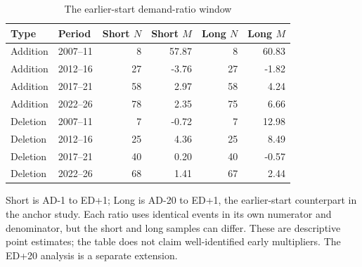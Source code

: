 \begin{table}[!htbp]
\centering
\caption{The earlier-start demand-ratio window}\label{tab:long_demand}
\small
\setlength{\tabcolsep}{5pt}
\begin{tabular}{llrrrr}
\toprule
Type & Period & Short $N$ & Short $M$ & Long $N$ & Long $M$ \\
\midrule
Addition & 2007--11 & 8 & 57.87 & 8 & 60.83 \\
Addition & 2012--16 & 27 & -3.76 & 27 & -1.82 \\
Addition & 2017--21 & 58 & 2.97 & 58 & 4.24 \\
Addition & 2022--26 & 78 & 2.35 & 75 & 6.66 \\
Deletion & 2007--11 & 7 & -0.72 & 7 & 12.98 \\
Deletion & 2012--16 & 25 & 4.36 & 25 & 8.49 \\
Deletion & 2017--21 & 40 & 0.20 & 40 & -0.57 \\
Deletion & 2022--26 & 68 & 1.41 & 67 & 2.44 \\
\bottomrule
\end{tabular}
\begin{minipage}{\linewidth}\footnotesize\vspace{5pt}
Short is AD-1 to ED+1; Long is AD-20 to ED+1, the earlier-start counterpart in the anchor study. Each ratio uses identical events in its own numerator and denominator, but the short and long samples can differ. These are descriptive point estimates; the table does not claim well-identified early multipliers. The ED+20 analysis is a separate extension.
\end{minipage}
\end{table}
